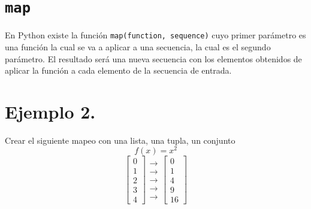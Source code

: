\documentclass[
  letterpaper,
  DIV=11,
  numbers=noendperiod]{scrreprt}
\begin{document}
\section{\texorpdfstring{\texttt{map}}{map}}\label{map}

En Python existe la función \texttt{map(function,\ sequence)} cuyo
primer parámetro es una función la cual se va a aplicar a una secuencia,
la cual es el segundo parámetro. El resultado será una nueva secuencia
con los elementos obtenidos de aplicar la función a cada elemento de la
secuencia de entrada.

\section{\texorpdfstring{\textbf{Ejemplo
2.}}{Ejemplo 2.}}\label{ejemplo-2.-1}

Crear el siguiente mapeo con una lista, una tupla, un conjunto \[
f(x) = x^2 
\] \[
\left[
\begin{matrix}
0 \\
1 \\
2 \\
3 \\
4
\end{matrix}
\right]
\begin{matrix}
\longrightarrow \\
\longrightarrow \\
\longrightarrow \\
\longrightarrow \\
\longrightarrow
\end{matrix}
\left[
\begin{matrix}
0 \\
1 \\
4 \\
9 \\
16
\end{matrix}
\right]
\]
\end{document}
